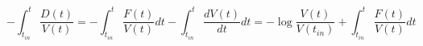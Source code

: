 \begin{equation}
-\int_{t_{in}}^t \frac{D(t)}{V(t)}=-\int_{t_{in}}^t \frac{F(t)}{V(t)} dt - \int_{t_{in}}^t \frac{dV(t)}{dt} dt = -\log \frac{V(t)}{V(t_{in})}+ \int_{t_{in}}^t \frac{F(t)}{V(t)} dt
\end{equation}